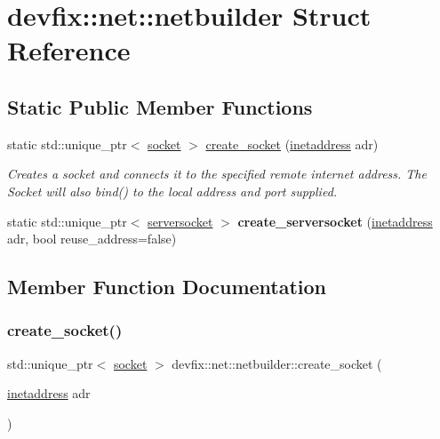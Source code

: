 \hypertarget{structdevfix_1_1net_1_1netbuilder}{}\section{devfix\+:\+:net\+:\+:netbuilder Struct Reference}
\label{structdevfix_1_1net_1_1netbuilder}
\subsection*{Static Public Member Functions}
\begin{DoxyCompactItemize}
\item 
static std\+::unique\+\_\+ptr$<$ \hyperlink{structdevfix_1_1net_1_1socket}{socket} $>$ \hyperlink{structdevfix_1_1net_1_1netbuilder_a9d9eb6cb050ca920aa647baaf4692405}{create\+\_\+socket} (\hyperlink{structdevfix_1_1net_1_1inetaddress}{inetaddress} adr)
\begin{DoxyCompactList}\small\item\em Creates a socket and connects it to the specified remote internet address. The Socket will also bind() to the local address and port supplied. \end{DoxyCompactList}\item 
\mbox{\label{structdevfix_1_1net_1_1netbuilder_a9d685e1822c0be5d68fd6ba62876798b}} 
static std\+::unique\+\_\+ptr$<$ \hyperlink{structdevfix_1_1net_1_1serversocket}{serversocket} $>$ {\bfseries create\+\_\+serversocket} (\hyperlink{structdevfix_1_1net_1_1inetaddress}{inetaddress} adr, bool reuse\+\_\+address=false)
\end{DoxyCompactItemize}


\subsection{Member Function Documentation}
\mbox{\label{structdevfix_1_1net_1_1netbuilder_a9d9eb6cb050ca920aa647baaf4692405}} 
\subsubsection{\texorpdfstring{create\+\_\+socket()}{create\_socket()}}
{\footnotesize\ttfamily std\+::unique\+\_\+ptr$<$ \hyperlink{structdevfix_1_1net_1_1socket}{socket} $>$ devfix\+::net\+::netbuilder\+::create\+\_\+socket (\begin{DoxyParamCaption}\item[{\hyperlink{structdevfix_1_1net_1_1inetaddress}{inetaddress}}]{adr }\end{DoxyParamCaption})\hspace{0.3cm}{\ttfamily [static]}}



